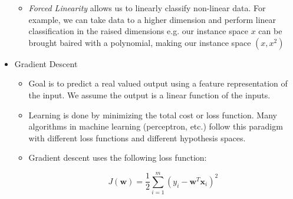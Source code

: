 \documentclass{article}
\begin{document}
\begin{itemize}
\begin{itemize}
	\item {\em Forced Linearity} allows us to linearly classify non-linear data. For example, we can take data to a higher dimension and perform linear classification in the raised dimensions e.g. our instance space $x$ can be brought baired with a polynomial, making our instance space $(x,x^{2})$
	\end{itemize}
\item Gradient Descent
	\begin{itemize}
	\item Goal is to predict a real valued output using a feature representation of the input. We assume the output is a linear function of the inputs.
	\item Learning is done by minimizing the total cost or loss function. Many algorithms in machine learning (perceptron, etc.) follow this paradigm with different loss functions and different hypothesis spaces.
	\item Gradient descent uses the following loss function:

		\[
	J(\mathbf{w}) = \frac{1}{2}\sum_{i=1}^{m}(y_{i}-\mathbf{w}^{T}\mathbf{x}_{i})^{2}
		\]
	\end{itemize}
\end{itemize}
\end{document}
